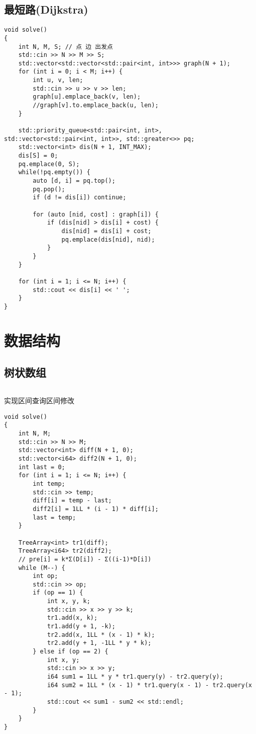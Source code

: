 \documentclass[a4paper, 10pt]{paper}
\newcommand{\cpp}[1]{\inputminted[frame=single, linenos=true]{cpp}{#1}}
\begin{document}
        \subsection{最短路(Dijkstra)}
        \begin{verbatim}
void solve()
{
    int N, M, S; // 点 边 出发点
    std::cin >> N >> M >> S;
    std::vector<std::vector<std::pair<int, int>>> graph(N + 1);
    for (int i = 0; i < M; i++) {
        int u, v, len;
        std::cin >> u >> v >> len;
        graph[u].emplace_back(v, len);
        //graph[v].to.emplace_back(u, len);
    }

    std::priority_queue<std::pair<int, int>, std::vector<std::pair<int, int>>, std::greater<>> pq;
    std::vector<int> dis(N + 1, INT_MAX);
    dis[S] = 0;
    pq.emplace(0, S);
    while(!pq.empty()) {
        auto [d, i] = pq.top();
        pq.pop();
        if (d != dis[i]) continue;

        for (auto [nid, cost] : graph[i]) {
            if (dis[nid] > dis[i] + cost) {
                dis[nid] = dis[i] + cost;
                pq.emplace(dis[nid], nid);
            }
        }
    }

    for (int i = 1; i <= N; i++) {
        std::cout << dis[i] << ' ';
    }
}
        \end{verbatim}
        
    \section{数据结构}
        \subsection{树状数组}
        \cpp{../tree_array.cpp}
        实现区间查询区间修改
        \begin{verbatim}
void solve()
{
    int N, M;
    std::cin >> N >> M;
    std::vector<int> diff(N + 1, 0);
    std::vector<i64> diff2(N + 1, 0);
    int last = 0;
    for (int i = 1; i <= N; i++) {
        int temp;
        std::cin >> temp;
        diff[i] = temp - last;
        diff2[i] = 1LL * (i - 1) * diff[i];
        last = temp;
    }

    TreeArray<int> tr1(diff);
    TreeArray<i64> tr2(diff2);
    // pre[i] = k*Σ(D[i]) - Σ((i-1)*D[i])
    while (M--) {
        int op;
        std::cin >> op;
        if (op == 1) {
            int x, y, k;
            std::cin >> x >> y >> k;
            tr1.add(x, k);
            tr1.add(y + 1, -k);
            tr2.add(x, 1LL * (x - 1) * k);
            tr2.add(y + 1, -1LL * y * k);
        } else if (op == 2) {
            int x, y;
            std::cin >> x >> y;
            i64 sum1 = 1LL * y * tr1.query(y) - tr2.query(y);
            i64 sum2 = 1LL * (x - 1) * tr1.query(x - 1) - tr2.query(x - 1);
            std::cout << sum1 - sum2 << std::endl;
        }
    }
}
        \end{verbatim}
\end{document}
